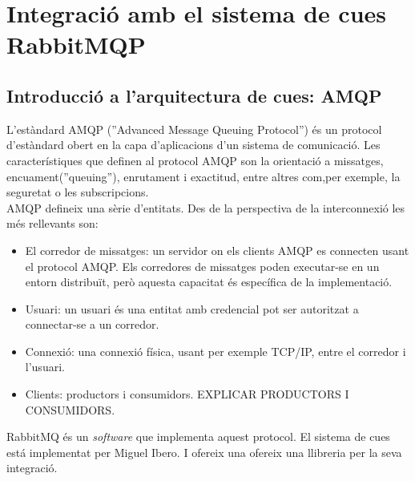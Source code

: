 \section{Integraci\'{o} amb el sistema de cues RabbitMQP}
\subsection{Introducci\'{o} a l'arquitectura de cues: AMQP}
\label{sec:queue_system_overview}
L'est\`{a}ndard AMQP (''Advanced Message Queuing Protocol'') \'{e}s un protocol d'est\`{a}ndard obert en la capa d'aplicacions d'un sistema de comunicació. Les característiques que definen al protocol AMQP son la orientació a missatges, encuament(''queuing''), enrutament i exactitud, entre altres com,per exemple, la seguretat o les subscripcions.\cite{amqp}\\
AMQP defineix una s\`{e}rie d'entitats. Des de la perspectiva de la interconnexió les m\'{e}s rellevants son:
\begin{itemize}
\item El corredor de missatges: un servidor on els clients AMQP es connecten usant el protocol AMQP. Els corredores de missatges poden executar-se en un entorn distribuït, però aquesta capacitat \'{e}s espec\'{i}fica de la implementació.
\item Usuari: un usuari \'{e}s una entitat amb credencial pot ser autoritzat a connectar-se a un corredor.
\item Connexió: una connexi\'{o} f\'{i}sica, usant per exemple TCP/IP, entre el corredor i l'usuari.
\item Clients: productors i consumidors. EXPLICAR PRODUCTORS I CONSUMIDORS.
\end{itemize}

RabbitMQ \'{e}s un \textit{software} que implementa aquest protocol. El sistema de cues est\'{a} implementat per Miguel Ibero. I ofereix una ofereix una llibreria per la seva integraci\'{o}. 

